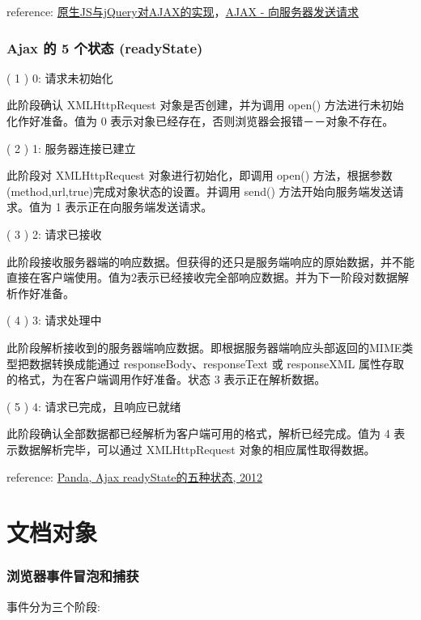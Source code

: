 reference:
\href{http://segmentfault.com/a/1190000003096293}{原生JS与jQuery对AJAX的实现}，\href{http://www.w3school.com.cn/ajax/ajax_xmlhttprequest_send.asp}{AJAX
- 向服务器发送请求}

\subsubsection{Ajax 的 5 个状态
(readyState)}\label{ajax-ux7684-5-ux4e2aux72b6ux6001-readystate}

( 1 ) 0: 请求未初始化

此阶段确认 XMLHttpRequest 对象是否创建，并为调用 open()
方法进行未初始化作好准备。值为 0
表示对象已经存在，否则浏览器会报错－－对象不存在。

( 2 ) 1: 服务器连接已建立

此阶段对 XMLHttpRequest 对象进行初始化，即调用 open() 方法，根据参数
(method,url,true)完成对象状态的设置。并调用 send()
方法开始向服务端发送请求。值为 1 表示正在向服务端发送请求。

( 3 ) 2: 请求已接收

此阶段接收服务器端的响应数据。但获得的还只是服务端响应的原始数据，并不能直接在客户端使用。值为2表示已经接收完全部响应数据。并为下一阶段对数据解析作好准备。

( 4 ) 3: 请求处理中

此阶段解析接收到的服务器端响应数据。即根据服务器端响应头部返回的MIME类型把数据转换成能通过
responseBody、responseText 或 responseXML
属性存取的格式，为在客户端调用作好准备。状态 3 表示正在解析数据。

( 5 ) 4: 请求已完成，且响应已就绪

此阶段确认全部数据都已经解析为客户端可用的格式，解析已经完成。值为 4
表示数据解析完毕，可以通过 XMLHttpRequest 对象的相应属性取得数据。

reference:
\href{http://blog.163.com/freestyle_le/blog/static/183279448201269112527311/}{Panda,
Ajax readyState的五种状态, 2012}

\section{文档对象}\label{ux6587ux6863ux5bf9ux8c61}

\subsubsection{浏览器事件冒泡和捕获}\label{ux6d4fux89c8ux5668ux4e8bux4ef6ux5192ux6ce1ux548cux6355ux83b7}

事件分为三个阶段:

